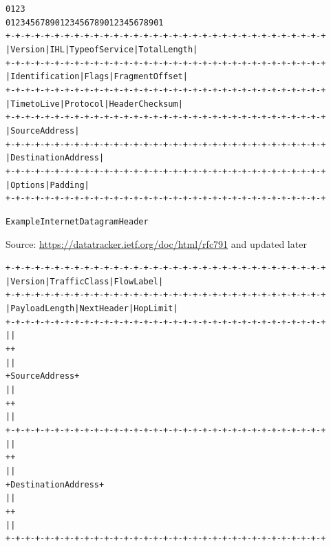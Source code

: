 \documentclass[Screen16to9,17pt]{foils}
\begin{document}
\begin{alltt}\footnotesize
    0                   1                   2                   3
    0 1 2 3 4 5 6 7 8 9 0 1 2 3 4 5 6 7 8 9 0 1 2 3 4 5 6 7 8 9 0 1
   +-+-+-+-+-+-+-+-+-+-+-+-+-+-+-+-+-+-+-+-+-+-+-+-+-+-+-+-+-+-+-+-+
   |Version|  IHL  |Type of Service|          Total Length         |
   +-+-+-+-+-+-+-+-+-+-+-+-+-+-+-+-+-+-+-+-+-+-+-+-+-+-+-+-+-+-+-+-+
   |         Identification        |Flags|      Fragment Offset    |
   +-+-+-+-+-+-+-+-+-+-+-+-+-+-+-+-+-+-+-+-+-+-+-+-+-+-+-+-+-+-+-+-+
   |  Time to Live |    Protocol   |         Header Checksum       |
   +-+-+-+-+-+-+-+-+-+-+-+-+-+-+-+-+-+-+-+-+-+-+-+-+-+-+-+-+-+-+-+-+
   |                       Source Address                          |
   +-+-+-+-+-+-+-+-+-+-+-+-+-+-+-+-+-+-+-+-+-+-+-+-+-+-+-+-+-+-+-+-+
   |                    Destination Address                        |
   +-+-+-+-+-+-+-+-+-+-+-+-+-+-+-+-+-+-+-+-+-+-+-+-+-+-+-+-+-+-+-+-+
   |                    Options                    |    Padding    |
   +-+-+-+-+-+-+-+-+-+-+-+-+-+-+-+-+-+-+-+-+-+-+-+-+-+-+-+-+-+-+-+-+

                    Example Internet Datagram Header
\end{alltt}
Source: \url{https://datatracker.ietf.org/doc/html/rfc791} and updated later

\vskip -1cm
\begin{alltt}\footnotesize
   +-+-+-+-+-+-+-+-+-+-+-+-+-+-+-+-+-+-+-+-+-+-+-+-+-+-+-+-+-+-+-+-+
   |Version| Traffic Class |           Flow Label                  |
   +-+-+-+-+-+-+-+-+-+-+-+-+-+-+-+-+-+-+-+-+-+-+-+-+-+-+-+-+-+-+-+-+
   |         Payload Length        |  Next Header  |   Hop Limit   |
   +-+-+-+-+-+-+-+-+-+-+-+-+-+-+-+-+-+-+-+-+-+-+-+-+-+-+-+-+-+-+-+-+
   |                                                               |
   +                                                               +
   |                                                               |
   +                         Source Address                        +
   |                                                               |
   +                                                               +
   |                                                               |
   +-+-+-+-+-+-+-+-+-+-+-+-+-+-+-+-+-+-+-+-+-+-+-+-+-+-+-+-+-+-+-+-+
   |                                                               |
   +                                                               +
   |                                                               |
   +                      Destination Address                      +
   |                                                               |
   +                                                               +
   |                                                               |
   +-+-+-+-+-+-+-+-+-+-+-+-+-+-+-+-+-+-+-+-+-+-+-+-+-+-+-+-+-+-+-+-+
\end{alltt}
\end{document}
